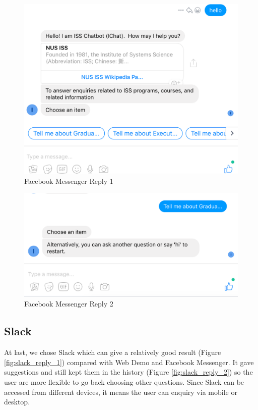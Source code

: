 		\begin{figure}[h]
			\centering
			\includegraphics[width=\linewidth/3, frame]{img/fb_1.png}
			\caption{Facebook Messenger Reply 1}
			\label{fig:fb_reply_1}
		\end{figure}

		\begin{figure}[h]
			\centering
			\includegraphics[width=\linewidth/3, frame]{img/fb_2.png}
			\caption{Facebook Messenger Reply 2}
			\label{fig:fb_reply_2}
		\end{figure}

	\subsection{Slack} %
	\label{sub:slack}
		At last, we chose Slack which can give a relatively good result (Figure \ref{fig:slack_reply_1}) compared with Web Demo and Facebook Messenger. It gave suggestions and still kept them in the history (Figure \ref{fig:slack_reply_2}) so the user are more flexible to go back choosing other questions. Since Slack can be accessed from different devices, it means the user can enquiry via mobile or desktop.

